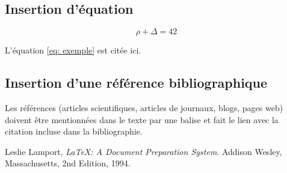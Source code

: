 \documentclass{rapportCS}
\begin{document}
\subsection{Insertion d'équation}

\begin{equation} \label{eq: exemple}
\rho + \Delta = 42
\end{equation}

L'équation \ref{eq: exemple} est citée ici. 

\subsection{Insertion d'une référence bibliographique}
Les références (articles scientifiques, articles de journaux, blogs, pages web) doivent être mentionnées dans le texte par une balise \cite{maref} et fait le lien avec la citation incluse dans la bibliographie.


\begin{thebibliography}{15} %
	  Leslie Lamport,
	  \emph{\LaTeX: A Document Preparation System}.
	  Addison Wesley, Massachusetts,
	  2nd Edition,
	  1994.
\end{thebibliography}



\newpage
\listoffigures
\end{document}
